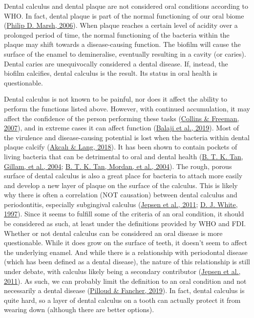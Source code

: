 \documentclass[
  letterpaper,
]{book}
\begin{document}
Dental calculus and dental plaque are not considered oral conditions
according to WHO. In fact, dental plaque is part of the normal
functioning of our oral biome
(\protect\hyperlink{ref-marshDentalPlaque2006}{Philip D. Marsh, 2006}).
When plaque reaches a certain level of acidity over a prolonged period
of time, the normal functioning of the bacteria within the plaque may
shift towards a disease-causing function. The biofilm will cause the
surface of the enamel to demineralise, eventually resulting in a cavity
(or caries). Dental caries are unequivocally considered a dental
disease. If, instead, the biofilm calcifies, dental calculus is the
result. Its status in oral health is questionable.

Dental calculus is not known to be painful, nor does it affect the
ability to perform the functions listed above. However, with continued
accumulation, it may affect the confidence of the person performing
these tasks (\protect\hyperlink{ref-collinsHomelessDental2007}{Collins
\& Freeman, 2007}), and in extreme cases it can affect function
(\protect\hyperlink{ref-balajiUnusualPresentation2019}{Balaji et al.,
2019}). Most of the virulence and disease-causing potential is lost when
the bacteria within dental plaque calcify
(\protect\hyperlink{ref-akcaliDentalCalculus2018}{Akcalı \& Lang,
2018}). It has been shown to contain pockets of living bacteria that can
be detrimental to oral and dental health
(\protect\hyperlink{ref-tanCalculusUltrastructure2004}{B. T. K. Tan,
Gillam, et al., 2004};
\protect\hyperlink{ref-tanBacterialViability2004}{B. T. K. Tan, Mordan,
et al., 2004}). The rough, porous surface of dental calculus is also a
great place for bacteria to attach more easily and develop a new layer
of plaque on the surface of the calculus. This is likely why there is
often a correlation (NOT causation) between dental calculus and
periodontitis, especially subgingival calculus
(\protect\hyperlink{ref-jepsenCalculusRemoval2011}{Jepsen et al., 2011};
\protect\hyperlink{ref-whiteDentalCalculus1997}{D. J. White, 1997}).
Since it seems to fulfill some of the criteria of an oral condition, it
should be considered as such, at least under the definitions provided by
WHO and FDI. Whether or not dental calculus can be considered an oral
disease is more questionable. While it does grow on the surface of
teeth, it doesn't seem to affect the underlying enamel. And while there
is a relationship with periodontal disease (which has been defined as a
dental disease), the nature of this relationship is still under debate,
with calculus likely being a secondary contributor
(\protect\hyperlink{ref-jepsenCalculusRemoval2011}{Jepsen et al.,
2011}). As such, we can probably limit the definition to an oral
condition and not necessarily a dental disease
(\protect\hyperlink{ref-pilloudOutliningDefinition2019}{Pilloud \&
Fancher, 2019}). In fact, dental calculus is quite hard, so a layer of
dental calculus on a tooth can actually protect it from wearing down
(although there are better options).
\end{document}
